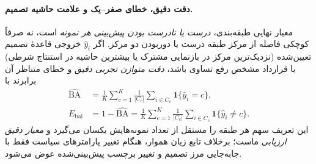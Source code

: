\paragraph{دقت دقیق، خطای صفر--یک و علامت حاشیه تصمیم.}
معیار نهایی طبقه‌بندی، \emph{درست یا نادرست بودن پیش‌بینی هر نمونه} است،
نه صرفاً کوچکی فاصله از مرکز طبقه درست یا دوربودن دو مرکز.
اگر $\widehat y_i$ خروجی قاعدهٔ تصمیم تعیین‌شده
(نزدیک‌ترین مرکز در بازنمایی مشترک یا
بیشترین حاشیه در استنتاج شرطی)
با قرارداد مشخص رفع تساوی باشد،
\emph{دقت متوازن تجربی دقیق} و خطای متناظر آن برابرند با
\begin{equation}\label{cmp:eq:ch3-js-exact-balanced-accuracy}
\boxed{
\begin{aligned}
\widehat{\mathrm{BA}}
&=\frac1K\sum_{c=1}^{K}\frac1{|C_c|}
\sum_{i\in C_c}\mathbf1\{\widehat y_i=c\},\\
E_{\mathrm{bal}}
&=1-\widehat{\mathrm{BA}}
=\frac1K\sum_{c=1}^{K}\frac1{|C_c|}
\sum_{i\in C_c}\mathbf1\{\widehat y_i\ne c\}.
\end{aligned}}
\end{equation}
این تعریف سهم هر طبقه را مستقل از تعداد نمونه‌هایش یکسان می‌گیرد
و \emph{معیار دقیق ارزیابی} ماست؛ برخلاف تابع زیان هموار،
هنگام تغییر پارامترهای سیاست فقط با جابه‌جایی مرز تصمیم
و تغییر برچسب پیش‌بینی‌شده عوض می‌شود.

